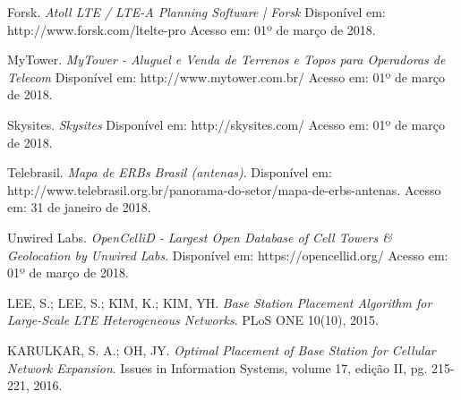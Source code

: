 \documentclass[]{politex}
\begin{document}
%

%

\begin{thebibliography}{9}
    
    Forsk.
    \textit{Atoll LTE / LTE-A Planning Software | Forsk}
    Disponível em: http://www.forsk.com/ltelte-pro
    Acesso em: 01º de março de 2018.

    MyTower.
    \textit{MyTower - Aluguel e Venda de Terrenos e Topos para
    Operadoras de Telecom}
    Disponível em: http://www.mytower.com.br/
    Acesso em: 01º de março de 2018.

    Skysites.
    \textit{Skysites}
    Disponível em: http://skysites.com/
    Acesso em: 01º de março de 2018.

    Telebrasil.
    \textit{Mapa de ERBs Brasil (antenas)}.
    Disponível em:
    http://www.telebrasil.org.br/panorama-do-setor/mapa-de-erbs-antenas.
    Acesso em: 31 de janeiro de 2018.

    Unwired Labs.
    \textit{OpenCelliD - Largest Open Database of Cell Towers \&
    Geolocation by Unwired Labs}.
    Disponível em: https://opencellid.org/
    Acesso em: 01º de março de 2018.

    LEE, S.; LEE, S.; KIM, K.; KIM, YH.
    \textit{Base Station Placement Algorithm for Large-Scale LTE
    Heterogeneous Networks}.
    PLoS ONE 10(10), 2015.

    KARULKAR, S. A.; OH, JY.
    \textit{Optimal Placement of Base Station for Cellular Network Expansion}.
    Issues in Information Systems, volume 17, edição II, pg. 215-221, 2016.

\end{thebibliography}
\apendice


\anexo
\end{document}
